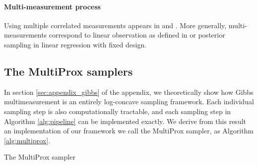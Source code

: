 
\paragraph{Multi-measurement process} Using multiple correlated measurements appears in \cite{saremi_multimeasurement_2021} and \cite{saremi_chain_2023}. More generally, multi-measurements correspond to linear observation as defined in \cite{montanari_posterior_2023} or posterior sampling in linear regression with fixed design.

\subsection{The MultiProx samplers}
In section \ref{sec:appendix_gibbs} of the appendix, we theoretically show how Gibbs multimeasurement is an entirely log-concave sampling framework. Each individual sampling step is also computationally tractable, and each sampling step in Algorithm \ref{alg:pipeline} can be implemented exactly. We derive from this result an implementation of our framework we call the MultiProx sampler, as Algorithm \ref{alg:multiprox}.

\begin{algorithm}[H]
    \caption{The MultiProx sampler}
    \label{alg:multiprox}
    \begin{algorithmic}
        \ENDIF
        \ENDFOR
        \ENDFOR
    \end{algorithmic}
\end{algorithm}

